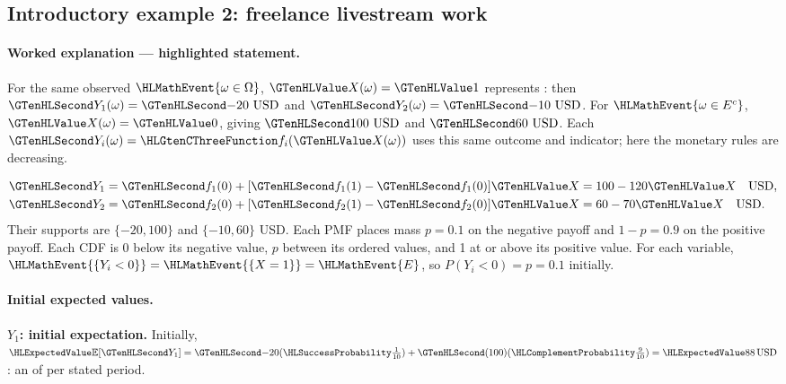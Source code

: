 \clearpage
\subsection{Introductory example 2: freelance livestream work}\label{ex:intro-two}
\CThreePlain{\CThreeStatementIntroTwo}
\CThreePlain{\CThreeIntroTaskOne}
\CThreePlain{\CThreeIntroTaskTwo}

\paragraph{Worked explanation --- highlighted statement.}
\CThreeStatementIntroTwo
\CThreeIntroTaskOne

For the same observed $\HLMathEvent{\omega\in\Omega}$, $\Indicator{X(\omega)}=\Indicator{1}$ represents : then $\Money{Y_1(\omega)}=\Money{-20\ \mathrm{USD}}$ and $\Money{Y_2(\omega)}=\Money{-10\ \mathrm{USD}}$.
For $\HLMathEvent{\omega\in E^c}$, $\Indicator{X(\omega)}=\Indicator{0}$, giving $\Money{100\ \mathrm{USD}}$ and $\Money{60\ \mathrm{USD}}$.
Each $\Money{Y_i(\omega)}=\TransformationFunction{f_i}(\Indicator{X(\omega)})$ uses this same outcome and indicator; here the monetary rules are decreasing.

\[
\begin{aligned}
\Money{Y_1}&=\Money{f_1(0)}+[\Money{f_1(1)}-\Money{f_1(0)}]\Indicator{X}=100-120\Indicator{X}\quad\text{USD},\\
\Money{Y_2}&=\Money{f_2(0)}+[\Money{f_2(1)}-\Money{f_2(0)}]\Indicator{X}=60-70\Indicator{X}\quad\text{USD}.
\end{aligned}
\]
Their supports are $\{-20,100\}$ and $\{-10,60\}$ USD. Each PMF places
mass $p=0.1$ on the negative payoff and $1-p=0.9$ on the positive payoff.
Each CDF is 0 below its negative value, $p$ between its ordered values,
and 1 at or above its positive value. For each variable,
$\HLMathEvent{\{Y_i<0\}}=\HLMathEvent{\{X=1\}}=\HLMathEvent{E}$, so $P(Y_i<0)=p=0.1$ initially.
\CThreeModelIntroTwo
\clearpage
\CThreeIntroTaskTwo
\paragraph{Initial expected values.}
\textbf{$Y_1$: initial expectation.}
Initially, $\ExpectedValue{\mathbb E}[\Money{Y_1}]=\Money{-20}(\SuccessProb{\frac{1}{10}})+\Money{(100)}(\FailureProb{\frac{9}{10}})=\ExpectedValue{88\,\text{USD}}$:
an  of  per stated period.


